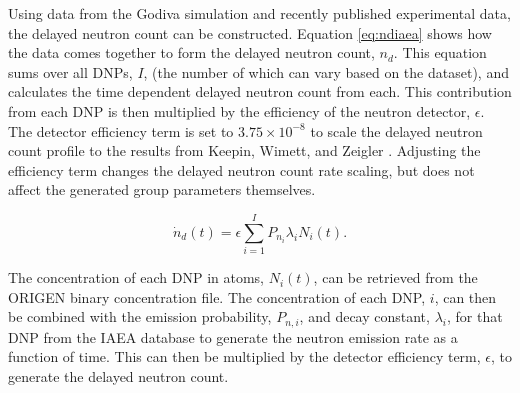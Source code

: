 \documentclass{style/nseJournal}
\begin{document}
Using data from the Godiva simulation and recently published experimental data, the delayed neutron count can be constructed.
Equation \eqref{eq:ndiaea} shows how the data comes together to form the delayed neutron count, $n_d$.
This equation sums over all DNPs, $I$, (the number of which can vary based on the dataset), and calculates the time dependent delayed neutron count from each.
This contribution from each DNP is then multiplied by the efficiency of the neutron detector, $\epsilon$.
The detector efficiency term is set to $3.75 \times 10^{-8}$ to scale the delayed neutron count profile to the results from Keepin, Wimett, and Zeigler \cite{KEEPIN1957IN2}.
Adjusting the efficiency term changes the delayed neutron count rate scaling, but does not affect the generated group parameters themselves.


\begin{equation}
\dot{n}_d(t) = \epsilon \sum_{i=1}^{I} P_{n_i} \lambda_i N_{i}(t).
\label{eq:ndiaea}
\end{equation}

The concentration of each DNP in atoms, $N_{i}(t)$, can be retrieved from the ORIGEN binary concentration file.
The concentration of each DNP, $i$, can then be combined with the emission probability, $P_{n, i}$, and decay constant, $\lambda_{i}$, for that DNP from the IAEA database to generate the neutron emission rate as a function of time.
This can then be multiplied by the detector efficiency term, $\epsilon$, to generate the delayed neutron count. 
\end{document}
